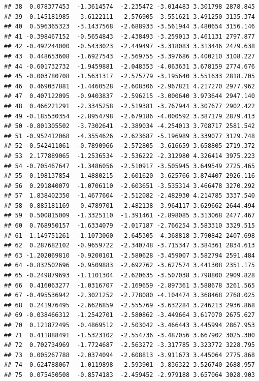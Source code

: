 \documentclass[]{article}
\begin{document}
\begin{verbatim}
## 38  0.078377453  -1.3614574  -2.235472 -3.014483 3.301798 2878.845
## 39 -0.145181985  -3.6122111  -2.576905 -3.551621 3.491250 3135.374
## 40  0.596365323  -3.1437568  -2.688933 -3.561944 3.480654 3156.146
## 41 -0.398467152  -0.5654843  -2.438493 -3.259013 3.461131 2797.877
## 42 -0.492244000  -0.5433023  -2.449497 -3.318083 3.313446 2479.638
## 43  0.448653608  -1.6927543  -2.569755 -3.397686 3.400210 3108.227
## 44 -0.601732732  -1.9459881  -2.048353 -4.063631 3.678159 2774.676
## 45 -0.003780708  -1.5631317  -2.575779 -3.195640 3.551633 2818.705
## 46  0.469037881  -1.4460528  -2.608306 -2.967821 4.217270 2977.962
## 47  0.407122095  -0.9403837  -2.596215 -3.000640 3.973644 2947.140
## 48  0.466221291  -2.3345258  -2.519381 -3.767944 3.307677 2902.422
## 49 -0.185530354  -2.8954798  -2.679186 -4.000592 3.387179 2879.413
## 50 -0.801305502  -3.7302641  -2.389034 -4.254013 3.708717 2581.542
## 51 -0.952412068  -4.3554626  -2.623687 -5.196989 3.339077 3129.748
## 52 -0.542411061  -0.7890966  -2.572805 -3.616659 3.658805 2719.372
## 53  2.177889065  -1.2536534  -2.536222 -2.312980 4.326414 3975.223
## 54 -0.705467647  -1.3486056  -2.510917 -3.505945 3.649549 2725.465
## 55 -0.198137854  -1.4880215  -2.601620 -3.625766 3.874407 2926.116
## 56  0.291840079  -1.0706110  -2.603651 -3.535314 3.466478 3270.292
## 57  1.838402350  -1.4677604  -2.512082 -2.482930 4.214785 3337.540
## 58 -0.885181169  -0.4789701  -2.482138 -3.964117 3.629662 2644.494
## 59  0.500815009  -1.3325110  -1.391461 -2.898085 3.313068 2477.467
## 60  0.768950157  -1.6334079  -2.017187 -2.766254 3.583310 3329.515
## 61 -1.149751261  -1.1073060  -2.645305 -4.368818 3.790842 2407.698
## 62  0.287682102  -0.9659722  -2.340748 -3.715347 3.384361 2834.613
## 63 -1.202069810  -0.9200101  -2.580628 -3.459007 3.582794 2591.484
## 64 -0.832502696  -0.9509883  -2.692762 -3.627574 3.441308 2351.175
## 65 -0.249879693  -1.1101304  -2.620635 -3.507038 3.798800 2909.828
## 66  0.416063277  -1.0316707  -2.169659 -2.897361 3.588678 3261.565
## 67 -0.495536942  -2.3021252  -2.778080 -4.104474 3.368468 2768.025
## 68  0.241976495  -2.6626859  -2.555769 -3.632284 3.246213 2936.868
## 69 -0.038466312  -1.2542701  -2.580862 -3.449664 3.617070 2675.627
## 70  0.121872495  -0.4869512  -2.503042 -3.466443 3.445994 2867.953
## 71  0.411888491  -1.5323102  -2.554736 -3.487056 3.667902 3025.300
## 72  0.702734969  -1.7724687  -2.563272 -3.317785 3.323772 3228.795
## 73  0.005267788  -2.0374094  -2.608813 -3.911673 3.445064 2775.868
## 74 -0.624788067  -1.0119898  -2.593901 -3.836322 3.526740 2688.957
## 75  0.075450508  -0.8574183  -2.459452 -2.979188 3.657064 3028.903

\end{verbatim}
\end{document}
